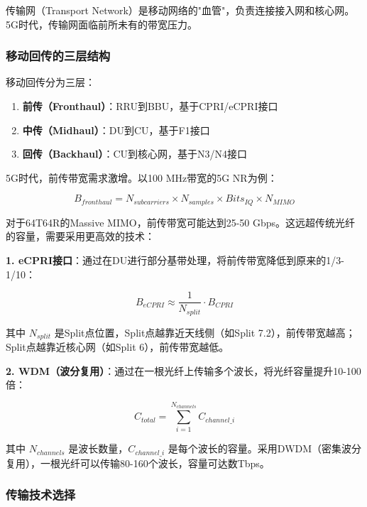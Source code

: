 传输网（Transport Network）是移动网络的"血管"，负责连接接入网和核心网。5G时代，传输网面临前所未有的带宽压力。

\subsubsection{移动回传的三层结构}

移动回传分为三层：

\begin{enumerate}
    \item \textbf{前传（Fronthaul）}：RRU到BBU，基于CPRI/eCPRI接口
    \item \textbf{中传（Midhaul）}：DU到CU，基于F1接口
    \item \textbf{回传（Backhaul）}：CU到核心网，基于N3/N4接口
\end{enumerate}

5G时代，前传带宽需求激增。以100 MHz带宽的5G NR为例：

\begin{equation}
B_{fronthaul} = N_{subcarriers} \times N_{samples} \times Bits_{IQ} \times N_{MIMO}
\end{equation}

对于64T64R的Massive MIMO，前传带宽可能达到25-50 Gbps。这远超传统光纤的容量，需要采用更高效的技术：

\textbf{1. eCPRI接口}：通过在DU进行部分基带处理，将前传带宽降低到原来的1/3-1/10：

\begin{equation}
B_{eCPRI} \approx \frac{1}{N_{split}} \cdot B_{CPRI}
\end{equation}

其中 $N_{split}$ 是Split点位置，Split点越靠近天线侧（如Split 7.2），前传带宽越高；Split点越靠近核心网（如Split 6），前传带宽越低。

\textbf{2. WDM（波分复用）}：通过在一根光纤上传输多个波长，将光纤容量提升10-100倍：

\begin{equation}
C_{total} = \sum_{i=1}^{N_{channels}} C_{channel\_i}
\end{equation}

其中 $N_{channels}$ 是波长数量，$C_{channel\_i}$ 是每个波长的容量。采用DWDM（密集波分复用），一根光纤可以传输80-160个波长，容量可达数Tbps。

\subsubsection{传输技术选择}

